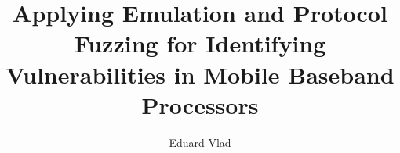 \documentclass[a4paper,11pt,oneside]{report}
\title{Applying Emulation and Protocol Fuzzing for Identifying Vulnerabilities in Mobile Baseband Processors}
\author{Eduard Vlad}
\begin{document}
\maketitle



\cleardoublepage
{}
{}
\nocite{*} %
\begin{multicols}{2}
  \smaller[1]
%   
    \printbibliography
\end{multicols}
\end{document}
